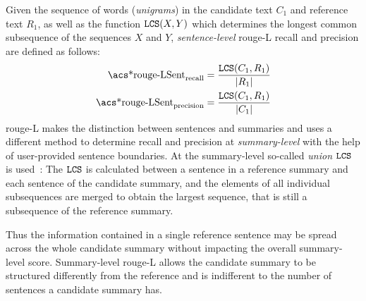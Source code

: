 Given the sequence of words (\emph{unigrams}) in the candidate text \(C_1\) and reference text \(R_1\),
as well as the function \(\texttt{LCS}(X, Y)\) which determines the longest common subsequence of the sequences \(X\) and \(Y\),
\emph{sentence-level} \acs*{rouge}-L recall and precision are defined as follows:
\begin{align}
\text{\acs*{rouge}-LSent}_\text{recall}    &= \frac{\lcs(C_1, R_1)}{|R_1|}\\
\text{\acs*{rouge}-LSent}_\text{precision} &= \frac{\lcs(C_1, R_1)}{|C_1|}
\end{align}
%
\acs*{rouge}-L makes the distinction between sentences and summaries
and uses a different method to determine recall and precision at \emph{summary-level}
with the help of user-provided sentence boundaries.
At the summary-level so-called \emph{union \(\texttt{LCS}\)} is used~\parencite[3]{rouge}:
The \(\texttt{LCS}\) is calculated between a sentence in a reference summary
and each sentence of the candidate summary,
and the elements of all individual subsequences are merged to obtain the largest sequence,
that is still a subsequence of the reference summary.

Thus the information contained in a single reference sentence may be spread
across the whole candidate summary without impacting the overall summary-level score.
Summary-level \acs*{rouge}-L allows the candidate summary to be structured differently from the reference
and is indifferent to the number of sentences a candidate summary has.


